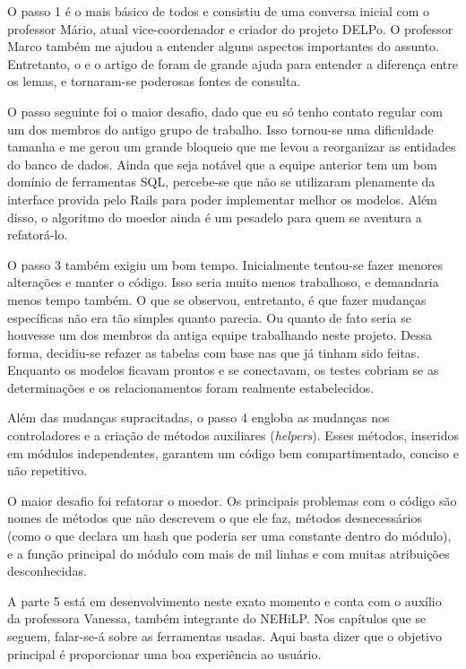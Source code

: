 O passo 1 é o mais básico de todos e consistiu de uma conversa inicial com o professor Mário, atual vice-coordenador
e criador do projeto DELPo. O professor Marco também me ajudou a entender alguns aspectos importantes do assunto.
Entretanto, o  e o artigo de \cite{Mar:17} foram de grande ajuda para entender a diferença entre os
lemas, e tornaram-se poderosas fontes de consulta.

O passo seguinte foi o maior desafio, dado que eu só tenho contato regular com um dos membros
do antigo grupo de trabalho. Isso tornou-se uma dificuldade tamanha e me gerou um grande bloqueio
que me levou a reorganizar as entidades do banco de dados. Ainda que seja notável que a equipe
anterior tem um bom domínio de ferramentas SQL, percebe-se que não se utilizaram plenamente da
interface provida pelo Rails para poder implementar melhor os modelos. Além disso, o algoritmo
do moedor ainda é um pesadelo para quem se aventura a refatorá-lo.

O passo 3 também exigiu um bom tempo. Inicialmente tentou-se fazer menores alterações e manter
o código. Isso seria muito menos trabalhoso, e demandaria menos tempo também. O que se observou,
entretanto, é que fazer mudanças específicas não era tão simples quanto parecia. Ou quanto de fato
seria se houvesse um dos membros da antiga equipe trabalhando neste projeto. Dessa forma, decidiu-se refazer as
tabelas com base nas que já tinham sido feitas. Enquanto os modelos ficavam prontos e se conectavam,
os testes cobriam se as determinações e os relacionamentos foram realmente estabelecidos.

Além das mudanças supracitadas, o passo 4 engloba as mudanças nos controladores e a criação de métodos
auxiliares (\emph{helpers}). Esses métodos, inseridos em módulos independentes, garantem um código bem
compartimentado, conciso e não repetitivo.

O maior desafio foi refatorar o moedor. Os principais problemas com o código são nomes de métodos que
não descrevem o que ele faz, métodos desnecessários (como o que declara um hash que poderia ser uma
constante dentro do módulo), e a função principal do módulo com mais de mil linhas e com muitas
atribuições desconhecidas.

A parte 5 está em desenvolvimento neste exato momento e conta com o auxílio da professora Vanessa,
também integrante do NEHiLP. Nos capítulos que se seguem, falar-se-á sobre as ferramentas usadas.
Aqui basta dizer que o objetivo principal é proporcionar uma boa experiência ao usuário.

